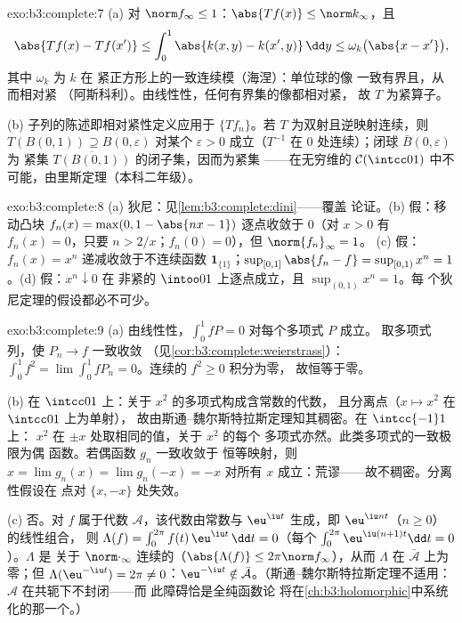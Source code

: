 \begin{solution}{exo:b3:complete:7}
(a) 对 $\norm f_\infty \leq 1$：$\abs{Tf(x)} \leq
\norm k_\infty$，且
\[
\abs{Tf(x) - Tf(x')} \leq \int_0^1\abs{k(x,y) -
k(x',y)}\,\dd y \leq \omega_k\bigl(\abs{x - x'}\bigr),
\]
其中 $\omega_k$ 为 $k$ 在
紧正方形上的一致连续模（海涅）：单位球的像
一致有界且，从而相对紧
（阿斯科利）。由线性性，任何有界集的像都相对紧，
故 $T$ 为紧算子。

(b) 子列的陈述即相对紧性定义应用于 $\{Tf_n\}$。若
$T$ 为双射且逆映射连续，则
$T(B(0,1)) \supseteq B(0,
\varepsilon)$ 对某个 $\varepsilon > 0$ 成立（$T^{-1}$ 在
$0$ 处连续）；闭球 $\bar B(0,\varepsilon)$ 为
紧集 $\overline{T(B(0,1))}$ 的闭子集，因而为紧集
——在无穷维的 $\mathcal
C(\intcc01)$ 中不可能，由里斯定理（本科二年级）。
\end{solution}

\begin{solution}{exo:b3:complete:8}
(a) 狄尼：见\cref{lem:b3:complete:dini}——覆盖
论证。(b) 假：移动凸块 $f_n(x) = \max(0, 1 -
\abs{nx - 1})$ 逐点收敛于 $0$（对 $x > 0$ 有 $f_n(x) =
0$，只要 $n > 2/x$；$f_n(0) = 0$），但 $\norm{f_n}_\infty = 1$。
(c) 假：$f_n(x) = x^n$ 递减收敛于不连续函数
$\mathbf 1_{\{1\}}$；$\sup_{[0,1]}\abs{f_n - f} = \sup_{[0,1)}
x^n = 1$。(d) 假：$x^n \downarrow 0$ 在
非紧的 $\intoo01$ 上逐点成立，且 $\sup_{(0,1)}x^n = 1$。每
个狄尼定理的假设都必不可少。
\end{solution}

\begin{solution}{exo:b3:complete:9}
(a) 由线性性，$\int_0^1 fP = 0$ 对每个多项式 $P$ 成立。
取多项式列，使 $P_n \to f$ 一致收敛
（见\cref{cor:b3:complete:weierstrass}）：$\int_0^1 f^2 =
\lim\int_0^1 fP_n = 0$。连续的 $f^2 \geq 0$ 积分为零，
故恒等于零。

(b) 在 $\intcc01$ 上：关于 $x^2$ 的多项式构成含常数的代数，
且分离点（$x \mapsto x^2$ 在 $\intcc01$ 上为单射），
故由斯通–魏尔斯特拉斯定理知其稠密。在 $\intcc{-1}1$ 上：
$x^2$ 在 $\pm x$ 处取相同的值，关于 $x^2$ 的每个
多项式亦然。此类多项式的一致极限为偶
函数。若偶函数 $g_n$ 一致收敛于
恒等映射，则 $x = \lim g_n(x) = \lim g_n(-x) = -x$ 对所有
$x$ 成立：荒谬——故不稠密。分离性假设在
点对 $\{x, -x\}$ 处失效。

(c) 否。对 $f$ 属于代数 $\mathcal A$，该代数由常数与
$\eu^{\iu t}$ 生成，即 $\eu^{\iu nt}$（$n \geq 0$）的线性组合，
则 $\Lambda(f) =
\int_0^{2\pi}f(t)\,\eu^{\iu t}\,\dd t = 0$（每个
$\int_0^{2\pi}\eu^{\iu(n+1)t}\dd t = 0$）。$\Lambda$ 是
关于 $\norm\cdot_\infty$ 连续的（$\abs{\Lambda(f)}\leq
2\pi\norm f_\infty$），从而 $\Lambda$ 在 $\bar{\mathcal
A}$ 上为零；但 $\Lambda(\eu^{-\iu t}) = 2\pi \neq 0$：$\eu^{-\iu t}
\notin \bar{\mathcal A}$。（斯通–魏尔斯特拉斯定理不适用：
$\mathcal A$ 在共轭下不封闭——而
此障碍恰是全纯函数论
将在\cref{ch:b3:holomorphic}中系统化的那一个。）
\end{solution}

